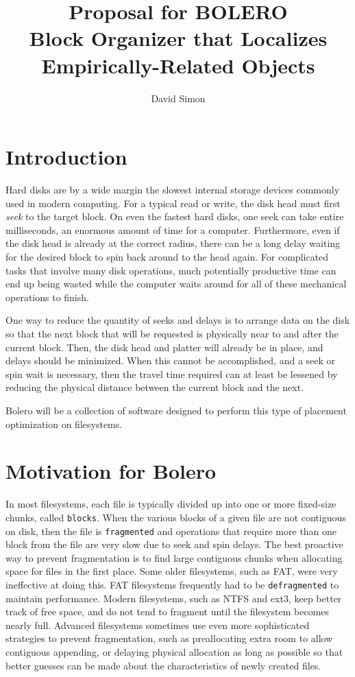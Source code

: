 \documentclass[10pt]{article}
\author{David Simon}
\title{Proposal for BOLERO\\\large{Block Organizer that Localizes
Empirically-Related Objects}}
\begin{document}
\maketitle

\section{Introduction}

Hard disks are by a wide margin the slowest internal storage devices commonly
used in modern computing. For a typical read or write, the disk head must first
\emph{seek} to the target block\cite{seektime}. On even the fastest hard disks\cite{deskstar}, one seek
can take entire milliseconds, an enormous amount of time for a computer. Furthermore, even if the disk head is already at the correct radius, there can be a long delay waiting for the
desired block to spin back around to the head again\cite{latency}. For complicated tasks that involve
many disk operations, much potentially productive time can end up being wasted while
the computer waits around for all of these mechanical operations to finish.

One way to reduce the quantity of seeks and delays is to arrange data on
the disk so that the next block that will be requested is physically near to
and after the current block\cite{autolocality}. Then, the disk head and platter will already be in place,
and delays should be minimized. When this cannot be accomplished, and a seek or
spin wait is necessary, then the travel time required can at least be lessened by reducing the
physical distance between the current block and the next.

Bolero will be a collection of software designed to perform this type of
placement optimization on filesystems.

\section{Motivation for Bolero}\label{sec:motive}

In most filesystems, each file is typically divided up
into one or more fixed-size chunks, called \texttt{blocks}. When the various blocks
of a given file are not contiguous on disk, then the file is \texttt{fragmented}
and operations that require more than one block from the file are very slow due to
seek and spin delays. The best proactive way to prevent fragmentation is to find large contiguous
chunks when allocating space for files in the first place. Some older filesystems, such as FAT, were
very ineffective at doing this\cite{fathistory}.
FAT filesystems frequently had to be \texttt{defragmented} to maintain performance.
Modern filesystems, such as NTFS and ext3, keep better track of free space,
and do not tend to fragment until the filesystem becomes nearly full. Advanced filesystems sometimes
use even more sophisticated strategies to prevent fragmentation, such as preallocating extra room to allow 
contiguous appending, or delaying physical allocation as long as possible so that better guesses
can be made about the characteristics of newly created files\cite{xfs}.
\end{document}

